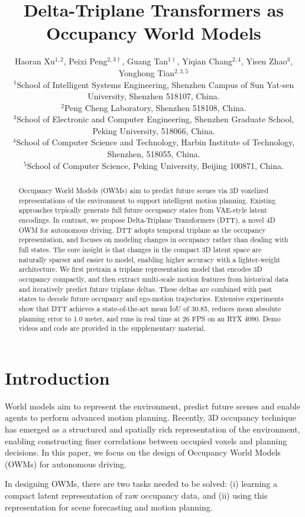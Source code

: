 \documentclass[11pt,a4paper]{article}
\title{Delta-Triplane Transformers as Occupancy World Models}
\author{
  Haoran Xu$^{1,2}$,\quad
  Peixi Peng$^{2,3\dagger}$,\quad
  Guang Tan$^{1\dagger}$,\quad
  Yiqian Chang$^{2,4}$,\quad
  Yisen Zhao$^3$,\quad
  Yonghong Tian$^{2,3,5}$ \\[0.8em]
  $^1$School of Intelligent Systems Engineering, Shenzhen Campus of Sun Yat-sen University, Shenzhen 518107, China. \\
  $^2$Peng Cheng Laboratory, Shenzhen 518108, China. \\
  $^3$School of Electronic and Computer Engineering, Shenzhen Graduate School, Peking University, 518066, China. \\
  $^4$School of Computer Science and Technology, Harbin Institute of Technology, Shenzhen, 518055, China. \\
  $^5$School of Computer Science, Peking University, Beijing 100871, China.
}
\date{}
\begin{document}
\maketitle

\begin{abstract}
Occupancy World Models (OWMs) aim to predict future scenes via 3D voxelized representations of the environment to support intelligent motion planning.
Existing approaches typically generate full future occupancy states from VAE-style latent encodings.
In contrast, we propose Delta-Triplane Transformers (DTT), a novel 4D OWM for autonomous driving.
DTT adopts temporal triplane as the occupancy representation, and focuses on modeling changes in occupancy rather than dealing with full states.
The core insight is that changes in the compact 3D latent space are naturally sparser and easier to model, enabling higher accuracy with a lighter-weight architecture.
We first pretrain a triplane representation model that encodes 3D occupancy compactly, and then extract multi-scale motion features from historical data and iteratively predict future triplane deltas.
These deltas are combined with past states to decode future occupancy and ego-motion trajectories.
Extensive experiments show that DTT achieves a state-of-the-art mean IoU of 30.85, reduces mean absolute planning error to 1.0 meter, and runs in real time at 26 FPS on an RTX 4090.
Demo videos and code are provided in the supplementary material.
\end{abstract}

\section{Introduction}

World models \cite{ref0,ref0a} aim to represent the environment, predict future scenes and enable agents to perform advanced motion planning.
Recently, 3D occupancy technique \cite{wenwentong2023,xiaoyutian2023} has emerged as a structured and spatially rich representation of the environment, enabling constructing finer correlations between occupied voxels and planning decisions.
In this paper, we focus on the design of Occupancy World Models (OWMs) for autonomous driving.

In designing OWMs, there are two tasks needed to be solved: (i) learning a compact latent representation of raw occupancy data, and (ii) using this representation for scene forecasting and motion planning.
\end{document}

